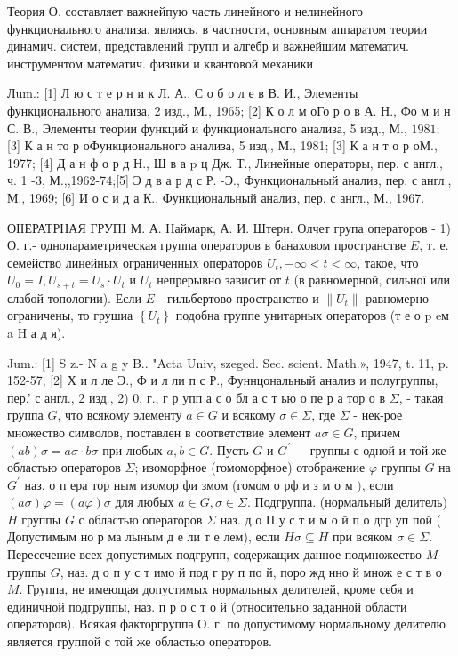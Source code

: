 \documentclass[10pt]{article}
\begin{document}
Теория О. составляет важнейпую часть линейного и нелинейного функционального анализа, являясь, в частности, основным аппаратом теории динамич. систем, представлений групп и алгебр и важнейшим математич. инструментом математич. физики и квантовой механики

Лum.: [1] Л ю с т е р н и к Л. А., С о б о л е в В. И., Элементы функционального анализа, 2 изд., М., 1965; [2] К о л м оГо р о в А. Н., Фо м и н С. В., Элементы теории функций и
функционального анализа, 5 изд., М., $1981 ;$ [3] К а н то р оФункционального анализа, 5 изд., М., 1981; [3] К а н т о р оМ., 1977; [4] Д а н ф о р д Н., Ш в а p ц Дж. Т., Линейные операторы, пер. с англ., ч. 1 -3, М.,,1962-74;[5] Э д в а р д с Р. -Э., Функциональный анализ, пер. с англ., М., 1969; [6] И о с и д а К., Функциональный анализ, пер. с англ., М., 1967.

ОІІЕРАТРНАЯ ГРУПI М. А. Наймарк, А. И. Штерн. Олчет група операторов - 1) О. г.- однопараметрическая группа операторов в банаховом пространстве $E$, т. е. семейство линейных ограниченных операторов $U_{t},-\infty<t<\infty$, такое, что $U_{0}=I, U_{s+t}=U_{s} \cdot U_{t}$ и $U_{t}$ непрерывно зависит от $t$ (в равномерной, сильної или слабой топологии). Если $E$ - гильбертово пространство и $\left\|U_{t}\right\|$ равномерно ограничены, то грушиа $\left\{U_{t}\right\}$ подобна группе унитарных операторов (т е о p eм a H а д я).

Jum.: [1] S z.- N a g y B.. "Acta Univ, szeged. Sec. scient. Math.», 1947, t. 11, p. 152-57; [2] Х и л ле Э., Ф и л ли п с Р., Фуннцональный анализ и полугруппы, пер.' с англ., 2 изд., 2) 0. г., г р упп а с о бл а с т ью о пе р а тор о в $\Sigma$, - такая группа $G$, что всякому элементу $a \in G$ и всякому $\sigma \in \Sigma$, где $\Sigma$ - нек-рое множество символов, поставлен в соответствие элемент $a \sigma \in G$, причем $(a b) \sigma=a \sigma \cdot b \sigma$ при любых $a, b \in G$. Пусть $G$ и $G^{\prime}-$ группы с одной и той же областью операторов $\Sigma$; изоморфное (гомоморфное) отображение $\varphi$ группы $G$ на $G^{\prime}$ наз. о п ера тор ным изомор фи змом (гомом о рф и з м о м $)$, если $(a \sigma) \varphi=(a \varphi) \sigma$ для любых $a \in G, \sigma \in \Sigma$. Подгруппа. (нормальный делитель) $H$ группы $G$ с областью операторов $\Sigma$ наз. д о П у с т и м о й п о дгр уп пой ( Допустимым но р ма лыным д е ли т е лем), если $H \sigma \subseteq H$ при всяком $\sigma \in \Sigma$. Пересечение всех допустимых подгрупп, содержащих данное подмножество $M$ группы $G$, наз. д о п у с т имо й под г ру п по й, поро жд нно й множ е с т в о $M$. Группа, не имеющая допустимых нормальных делителей, кроме себя и единичной подгруппы, наз. п р о с т о й (относительно заданной области операторов). Всякая факторгруппа О. г. по допустимому нормальному делителю является группой с той же областью операторов.
\end{document}
